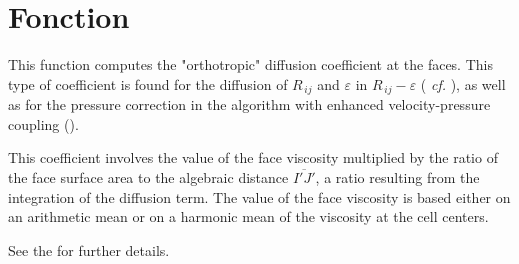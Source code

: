 
%
%
%
%


%
\hypertarget{cs\_face\_orthotropic\_viscosity\_vector}{}

\vspace{1cm}
\section*{Fonction}

This function computes the "orthotropic" diffusion coefficient at the faces. This type of coefficient is found for the diffusion of $R_{\,ij}$ and
$\varepsilon$ in $R_{\,ij}-\varepsilon$ ( {\it cf.} ), as well as for the pressure correction in the algorithm with enhanced velocity-pressure coupling ().

This coefficient involves the value of the face viscosity multiplied by the ratio of the face surface area to the algebraic distance $\overline{I'J'}$, a ratio resulting from the integration of the diffusion term.
The value of the face viscosity is based either on an arithmetic mean or on a harmonic mean of the viscosity at the cell centers.

See the  for further details.

